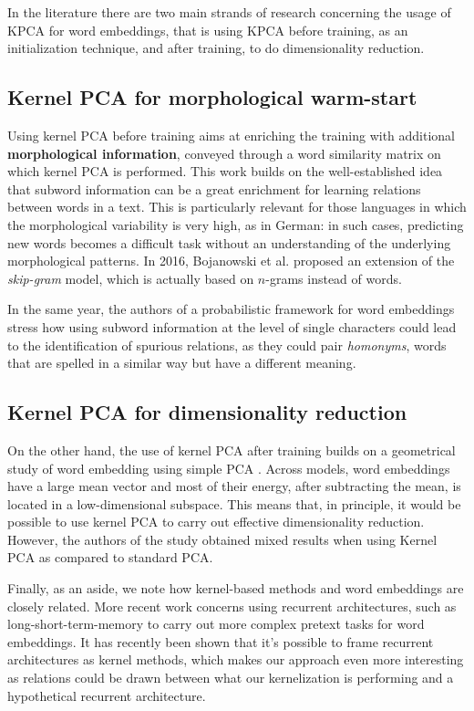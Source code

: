 
In the literature there are two main strands of research concerning the usage of KPCA for word embeddings, that is using KPCA before training, as an initialization technique, and after training, to do dimensionality reduction.

\subsection{Kernel PCA for morphological warm-start}

Using kernel PCA before training \cite{gupta_improving_2019} aims at enriching the training with additional \textbf{morphological information}, conveyed through a word similarity matrix on which kernel PCA is performed. 
This work builds on the well-established idea that subword information can be a great enrichment for learning relations between words in a text. 
This is particularly relevant for those languages in which the morphological variability is very high, as in German: in such cases, predicting new words becomes a difficult task without an understanding of the underlying morphological patterns. 
In 2016, Bojanowski et al. \cite{bojanowski_enriching_2016} proposed an extension of the \textit{skip-gram} model, which is actually based on $n$-grams instead of words. 

In the same year, the authors of a probabilistic framework for word embeddings \cite{bhatia_morphological_2016} stress how using subword information at the level of single characters could lead to the identification of spurious relations, as they could pair \textit{homonyms}, words that are spelled in a similar way but have a different meaning.

\subsection{Kernel PCA for dimensionality reduction}

On the other hand, the use of kernel PCA after training \cite{raunak_simple_2017} builds on a geometrical study of word embedding using simple PCA \cite{mu_all-but--top_2017}.
Across models, word embeddings have a large mean vector and most of their energy, after subtracting the mean, is located in a low-dimensional subspace.
This means that, in principle, it would be possible to use kernel PCA to carry out effective dimensionality reduction.
However, the authors of the study obtained mixed results when using Kernel PCA as compared to standard PCA.

Finally, as an aside, we note how kernel-based methods and word embeddings are closely related.
More recent work concerns using recurrent architectures, such as long-short-term-memory \cite{yepes_word_2017} to carry out more complex pretext tasks for word embeddings.
It has recently been shown \cite{fermanian_framing_2021} that it's possible to frame recurrent architectures as kernel methods, which makes our approach even more interesting as relations could be drawn between what our kernelization is performing and a hypothetical recurrent architecture.
